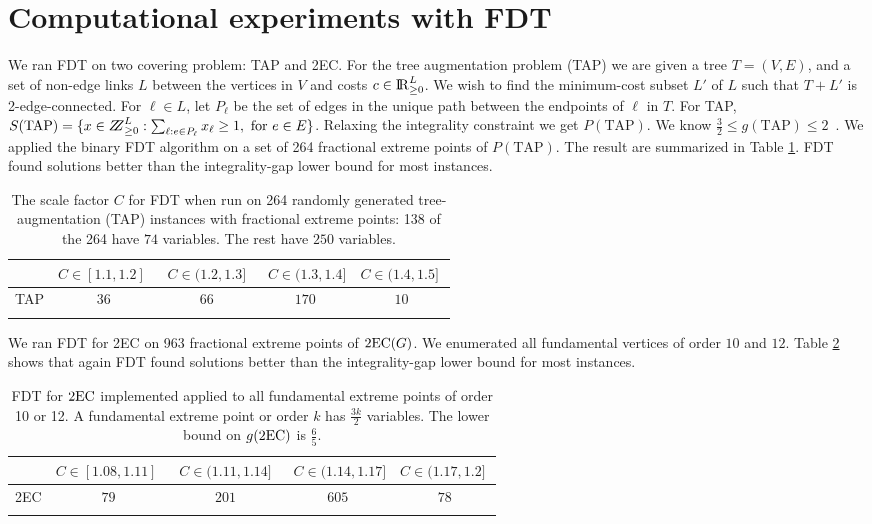 \section{Computational experiments with FDT}\label{experiment}
We ran FDT on two covering problem: TAP and 2EC. For the tree augmentation problem (TAP) we are given a tree $T=(V,E)$, and a set of non-edge links $L$ between the vertices in $V$ and costs $c\in {\rm I\!R}^{L}_{\geq 0}$. We wish to find the minimum-cost subset $L'$ of $L$ such that $T+L'$ is 2-edge-connected. For $\ell\in L$, let $P_\ell$ be the set of edges in the unique path between the endpoints of $\ell$ in $T$. For TAP, $S(\mbox{TAP})=\{x\in \bbbz^{L}_{\geq 0}: \sum_{\ell: e\in P_\ell}x_\ell \geq 1, \mbox{ for $e\in E$}\}$. Relaxing the integrality constraint we get $P(\mbox{TAP})$. We know $\frac{3}{2}\leq g({\mbox{TAP}})\leq 2$~\cite{fj,32gap}. We applied the binary FDT algorithm on a set of 264 fractional extreme points of $P(\mbox{TAP})$. The result are summarized in Table \ref{tableTAP}. FDT found solutions better than the integrality-gap lower bound for most instances.
\begin{table}[h]
	\centering
	  \begin{tabular}{c c c c c}
	  \toprule
	  	& $C\in [1.1,1.2]\;$ & $\;C\in (1.2,1.3]\;$ &
               $\;C\in (1.3,1.4]$ &\; $C\in (1.4,1.5]\;$ \\ \midrule
	  	TAP & $36$ & $66$ & $170$ & $10$\\  \bottomrule \\
	  \end{tabular}\caption{The scale factor $C$ for FDT when run on 264 randomly generated tree-augmentation (TAP) instances with fractional extreme points: 138 of the 264 have $74$ variables. The rest have $250$ variables.}
	  \label{tableTAP}
\end{table}
We ran FDT for 2EC on 963 fractional extreme points of $\operatorname{2EC}(G)$. We enumerated all fundamental vertices of order $10$ and $12$. Table \ref{table2EC} shows that again FDT found solutions better than the integrality-gap lower bound for most instances. 
\begin{table}[h]
	\centering
	  \begin{tabular}{c c c c c}
	  	\toprule
	  	& $C\in [1.08,1.11]\;$ & $\;C\in (1.11,1.14]\;$ &
               $\;C\in (1.14,1.17]$ &\; $C\in (1.17,1.2]\;$ \\ \midrule
	  	2EC & $79$ & $201$ & $605$ & $78$ \\ \bottomrule\\
	  \end{tabular}	\caption{FDT for $\operatorname{2EC}$ implemented applied to all fundamental extreme points of order 10 or 12. A fundamental extreme point or order $k$ has $\frac{3k}{2}$ variables. The lower bound on $g(\operatorname{2EC})$ is $\frac{6}{5}$.}
	  \label{table2EC}
\end{table}
